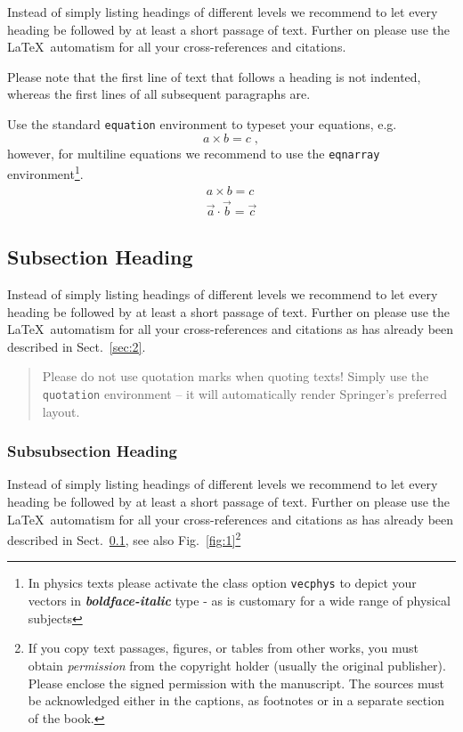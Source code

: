 \documentclass[graybox]{svmult}
\begin{document}
Instead of simply listing headings of different levels we recommend to
let every heading be followed by at least a short passage of text.
Further on please use the \LaTeX\ automatism for all your
cross-references and citations.

Please note that the first line of text that follows a heading is not indented, whereas the first lines of all subsequent paragraphs are.

Use the standard \verb|equation| environment to typeset your equations, e.g.
%
\begin{equation}
a \times b = c\;,
\end{equation}
%
however, for multiline equations we recommend to use the \verb|eqnarray| environment\footnote{In physics texts please activate the class option \texttt{vecphys} to depict your vectors in \textbf{\itshape boldface-italic} type - as is customary for a wide range of physical subjects}.
\begin{eqnarray}
a \times b = c \nonumber\\
\vec{a} \cdot \vec{b}=\vec{c}
\label{eq:01}
\end{eqnarray}

\subsection{Subsection Heading}
\label{subsec:2}
Instead of simply listing headings of different levels we recommend to
let every heading be followed by at least a short passage of text.
Further on please use the \LaTeX\ automatism for all your
cross-references and citations
as has already been described in Sect.~\ref{sec:2}.

\begin{quotation}
Please do not use quotation marks when quoting texts! Simply use the \verb|quotation| environment -- it will automatically render Springer's preferred layout.
\end{quotation}


\subsubsection{Subsubsection Heading}
Instead of simply listing headings of different levels we recommend to
let every heading be followed by at least a short passage of text.
Further on please use the \LaTeX\ automatism for all your
cross-references and citations as has already been described in
Sect.~\ref{subsec:2}, see also Fig.~\ref{fig:1}\footnote{If you copy
text passages, figures, or tables from other works, you must obtain
\textit{permission} from the copyright holder (usually the original
publisher). Please enclose the signed permission with the manuscript. The
sources must be acknowledged either in the
captions, as footnotes or in a separate section of the book.}
\end{document}
